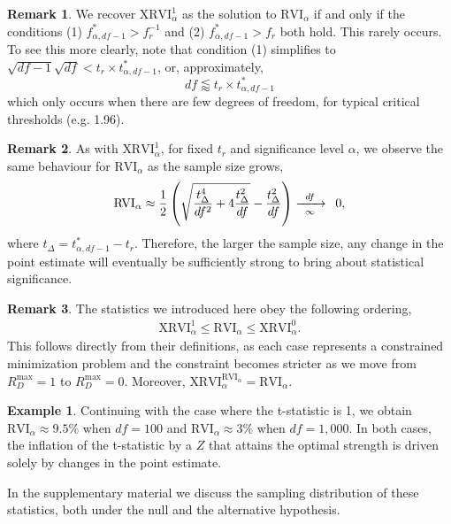 \documentclass[sts]{imsart}
\theoremstyle{plain}
\theoremstyle{definition}
\newtheorem{remark}{Remark}
\newtheorem{example}{Example}
\newcommand{\df}{df}
\newcommand{\Rdmax}{R^{\max }_{D}}
\newcommand{\fstar}{f^*_{\alpha, \df-1}}
\newcommand{\tstar}{t^*_{\alpha, \df-1}}
\newcommand{\tobs}{t_{r}}
\newcommand{\XRVI}{\text{XRVI}}
\newcommand{\RVI}{\text{RVI}}
\begin{document}
\begin{remark}
We recover $\XRVI^1_{\alpha}$ as the solution to $\RVI_{\alpha}$  if and only if the conditions (1) $\fstar > f_r^{-1}$ and (2) $\fstar > f_r$ both hold. This rarely occurs. To see this more clearly, note that condition
(1) simplifies to $\sqrt{\df-1}\sqrt{\df} < t_r\times {\tstar}$,  
or, approximately,
$$
\df \lessapprox t_r \times \tstar
$$
which only occurs when there are few degrees of freedom, for typical critical thresholds (e.g. 1.96).
\end{remark}


\begin{remark}
\label{rmk:rvi-df}
As with $\XRVI^1_{\alpha}$, for fixed $t_r$ and significance level $\alpha$, we observe the same behaviour for $\RVI_{\alpha}$ as the sample size grows,
    \begin{align*}
    \RVI_{\alpha}  \approx \frac{1}{2}\left(\sqrt{\frac{t_\Delta^4}{\df^2} + 4\frac{t_\Delta^2}{\df}} - \frac{t_\Delta^2}{\df}\right)  \xrightarrow[\enskip\infty\enskip]{\df} \enspace 0,
\end{align*}
where $t_\Delta = \tstar - \tobs$. Therefore, the larger the sample size, any change in the point estimate will eventually be sufficiently strong to bring about statistical significance.
\end{remark}



\begin{remark}
\label{rmk:order}
The statistics we introduced here obey the following ordering,
    \begin{align*}
    \XRVI^{1}_{\alpha} \leq \RVI_{\alpha}  \leq \XRVI^{0}_{\alpha}. 
\end{align*}
This follows directly from their definitions, as each case represents a constrained minimization problem and the constraint  
becomes stricter as we move from 
$\Rdmax = 1$ to $\Rdmax = 0$. Moreover, 
\mbox{$
\XRVI^{\RVI_\alpha}_{\alpha} = \RVI_{\alpha}
$}. 
\end{remark}

\begin{example}
Continuing with the case where the t-statistic is 1, we obtain $\text{RVI}_{\alpha} \approx 9.5\%$ when $\df=100$ and $\text{RVI}_{\alpha} \approx 3\%$ when $\df=1,000$. In both cases, the inflation of the t-statistic by a $Z$ that attains the optimal strength is driven solely by changes in the point estimate. 
\end{example}

In the supplementary material we discuss the sampling distribution of these statistics, both under the null and the alternative hypothesis.
\end{document}
